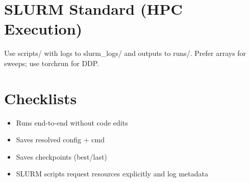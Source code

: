 \documentclass[11pt]{article}
\begin{document}
\section{SLURM Standard (HPC Execution)}
Use scripts/ with logs to slurm_logs/ and outputs to runs/. Prefer arrays for sweeps; use torchrun for DDP.

\section{Checklists}
\begin{itemize}
  \item Runs end-to-end without code edits
  \item Saves resolved config + cmd
  \item Saves checkpoints (best/last)
  \item SLURM scripts request resources explicitly and log metadata
\end{itemize}
\end{document}
